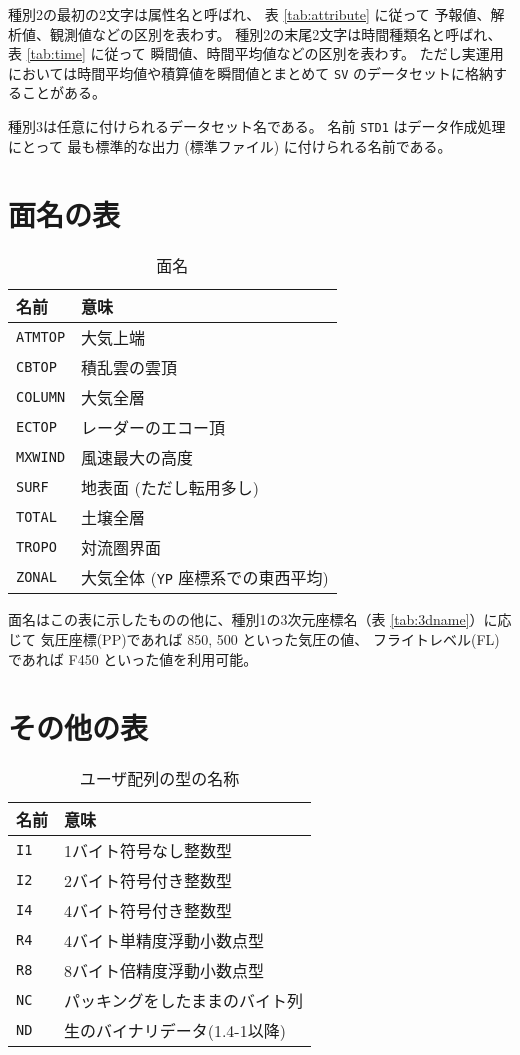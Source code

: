 種別2の最初の2文字は属性名と呼ばれ、
表 \ref{tab:attribute} に従って
予報値、解析値、観測値などの区別を表わす。
種別2の末尾2文字は時間種類名と呼ばれ、
表 \ref{tab:time} に従って
瞬間値、時間平均値などの区別を表わす。
ただし実運用においては時間平均値や積算値を瞬間値とまとめて
{\tt SV} のデータセットに格納することがある。

種別3は任意に付けられるデータセット名である。
名前 {\tt STD1} はデータ作成処理にとって
最も標準的な出力 (標準ファイル) に付けられる名前である。
\newpage
\section{面名の表}

\begin{table}[htp]
\begin{center}
\begin{tabular}{l|l}
\hline
名前 & 意味 \\
\hline
{\tt ATMTOP} & 大気上端 \\
{\tt CBTOP} & 積乱雲の雲頂 \\
{\tt COLUMN} & 大気全層 \\
{\tt ECTOP} & レーダーのエコー頂 \\
{\tt MXWIND} & 風速最大の高度 \\
{\tt SURF} & 地表面 (ただし転用多し) \\
{\tt TOTAL} & 土壌全層 \\
{\tt TROPO} & 対流圏界面 \\
{\tt ZONAL} & 大気全体 ({\tt YP} 座標系での東西平均) \\
\hline
\end{tabular}
\caption{面名}
\label{tab:plane}
\end{center}
\end{table}

面名はこの表に示したものの他に、種別1の3次元座標名（表 \ref{tab:3dname}）に応じて
気圧座標(PP)であれば 850, 500 といった気圧の値、
フライトレベル(FL)であれば F450 といった値を利用可能。

\section{その他の表}

\begin{table}[htp]
\begin{center}
\begin{tabular}{l|l}
\hline
名前 & 意味 \\
\hline
{\tt I1} & 1バイト符号なし整数型 \\
{\tt I2} & 2バイト符号付き整数型 \\
{\tt I4} & 4バイト符号付き整数型 \\
{\tt R4} & 4バイト単精度浮動小数点型 \\
{\tt R8} & 8バイト倍精度浮動小数点型 \\
{\tt NC} & パッキングをしたままのバイト列 \\
{\tt ND} & 生のバイナリデータ(1.4-1以降) \\ 
\hline
\end{tabular}
\caption{ユーザ配列の型の名称}
\label{tab:typename}
\end{center}
\end{table}


